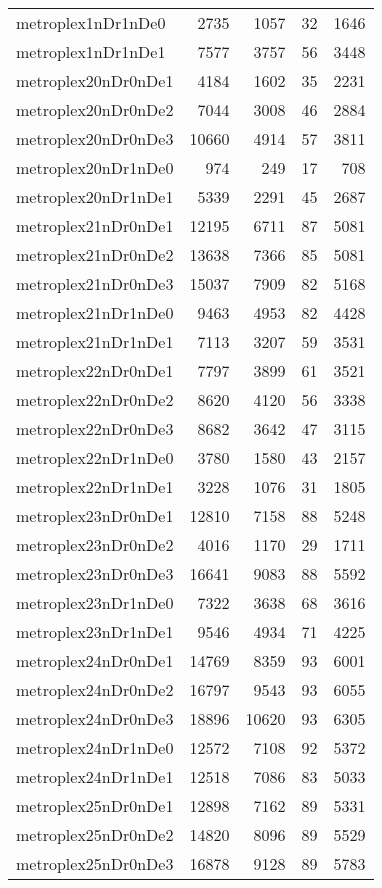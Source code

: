 \documentclass[../../../thesis.tex]{subfiles}
\begin{document}
\begin{longtable}{lrrrr}
metroplex1nDr1nDe0 & 2735 & 1057 & 32 & 1646 \\
metroplex1nDr1nDe1 & 7577 & 3757 & 56 & 3448 \\
metroplex20nDr0nDe1 & 4184 & 1602 & 35 & 2231 \\
metroplex20nDr0nDe2 & 7044 & 3008 & 46 & 2884 \\
metroplex20nDr0nDe3 & 10660 & 4914 & 57 & 3811 \\
metroplex20nDr1nDe0 & 974 & 249 & 17 & 708 \\
metroplex20nDr1nDe1 & 5339 & 2291 & 45 & 2687 \\
metroplex21nDr0nDe1 & 12195 & 6711 & 87 & 5081 \\
metroplex21nDr0nDe2 & 13638 & 7366 & 85 & 5081 \\
metroplex21nDr0nDe3 & 15037 & 7909 & 82 & 5168 \\
metroplex21nDr1nDe0 & 9463 & 4953 & 82 & 4428 \\
metroplex21nDr1nDe1 & 7113 & 3207 & 59 & 3531 \\
metroplex22nDr0nDe1 & 7797 & 3899 & 61 & 3521 \\
metroplex22nDr0nDe2 & 8620 & 4120 & 56 & 3338 \\
metroplex22nDr0nDe3 & 8682 & 3642 & 47 & 3115 \\
metroplex22nDr1nDe0 & 3780 & 1580 & 43 & 2157 \\
metroplex22nDr1nDe1 & 3228 & 1076 & 31 & 1805 \\
metroplex23nDr0nDe1 & 12810 & 7158 & 88 & 5248 \\
metroplex23nDr0nDe2 & 4016 & 1170 & 29 & 1711 \\
metroplex23nDr0nDe3 & 16641 & 9083 & 88 & 5592 \\
metroplex23nDr1nDe0 & 7322 & 3638 & 68 & 3616 \\
metroplex23nDr1nDe1 & 9546 & 4934 & 71 & 4225 \\
metroplex24nDr0nDe1 & 14769 & 8359 & 93 & 6001 \\
metroplex24nDr0nDe2 & 16797 & 9543 & 93 & 6055 \\
metroplex24nDr0nDe3 & 18896 & 10620 & 93 & 6305 \\
metroplex24nDr1nDe0 & 12572 & 7108 & 92 & 5372 \\
metroplex24nDr1nDe1 & 12518 & 7086 & 83 & 5033 \\
metroplex25nDr0nDe1 & 12898 & 7162 & 89 & 5331 \\
metroplex25nDr0nDe2 & 14820 & 8096 & 89 & 5529 \\
metroplex25nDr0nDe3 & 16878 & 9128 & 89 & 5783 \\

\end{longtable}
\end{document}
